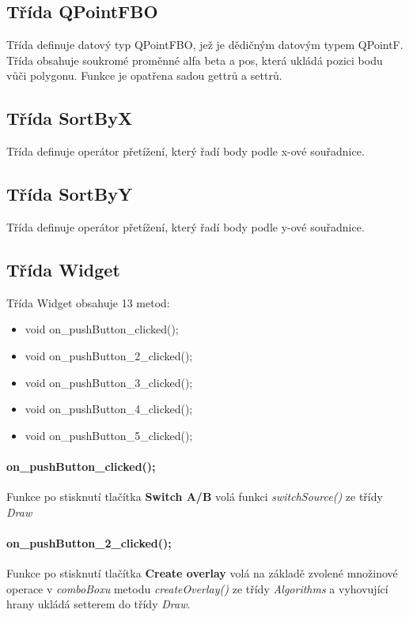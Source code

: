 \documentclass[11pt]{article}
\begin{document}
\subsection{Třída QPointFBO}
Třída definuje datový typ QPointFBO, jež je dědičným datovým typem QPointF. Třída obsahuje soukromé proměnné alfa beta a pos, která ukládá pozici bodu vůči polygonu. Funkce je opatřena sadou gettrů a settrů.

\subsection{Třída SortByX}
Třída definuje operátor přetížení, který řadí body podle x-ové souřadnice.

\subsection{Třída SortByY}
Třída definuje operátor přetížení, který řadí body podle y-ové souřadnice.

\subsection{Třída Widget}
Třída Widget obsahuje 13 metod:

\begin{itemize}
\item void on\_pushButton\_clicked();
\item void on\_pushButton\_2\_clicked();
\item void on\_pushButton\_3\_clicked();
\item void on\_pushButton\_4\_clicked();
\item void on\_pushButton\_5\_clicked();
\end{itemize}

\paragraph{on\_pushButton\_clicked();}
Funkce po stisknutí tlačítka \textbf{Switch A/B} volá funkci \textit{switchSource()} ze třídy \textit{Draw}

\paragraph{on\_pushButton\_2\_clicked();}
Funkce po stisknutí tlačítka \textbf{Create overlay} volá na základě zvolené množinové operace v \textit{comboBoxu} metodu \textit{createOverlay()} ze třídy \textit{Algorithms} a vyhovující hrany ukládá setterem do třídy \textit{Draw}.
\end{document}
